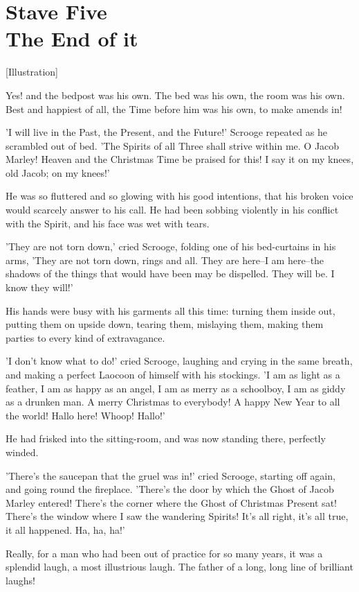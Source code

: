 \chapter{Stave Five\\The End of it}
[Illustration]

Yes! and the bedpost was his own. The bed was his own, the room was his
own. Best and happiest of all, the Time before him was his own, to make
amends in!

'I will live in the Past, the Present, and the Future!' Scrooge repeated
as he scrambled out of bed. 'The Spirits of all Three shall strive
within me. O Jacob Marley! Heaven and the Christmas Time be praised for
this! I say it on my knees, old Jacob; on my knees!'

He was so fluttered and so glowing with his good intentions, that his
broken voice would scarcely answer to his call. He had been sobbing
violently in his conflict with the Spirit, and his face was wet with
tears.

'They are not torn down,' cried Scrooge, folding one of his bed-curtains
in his arms, 'They are not torn down, rings and all. They are here--I am
here--the shadows of the things that would have been may be dispelled.
They will be. I know they will!'

His hands were busy with his garments all this time: turning them inside
out, putting them on upside down, tearing them, mislaying them, making
them parties to every kind of extravagance.

'I don't know what to do!' cried Scrooge, laughing and crying in the
same breath, and making a perfect Laocoon of himself with his stockings.
'I am as light as a feather, I am as happy as an angel, I am as merry as
a schoolboy, I am as giddy as a drunken man. A merry Christmas to
everybody! A happy New Year to all the world! Hallo here! Whoop! Hallo!'

He had frisked into the sitting-room, and was now standing there,
perfectly winded.

'There's the saucepan that the gruel was in!' cried Scrooge, starting
off again, and going round the fireplace. 'There's the door by which the
Ghost of Jacob Marley entered! There's the corner where the Ghost of
Christmas Present sat! There's the window where I saw the wandering
Spirits! It's all right, it's all true, it all happened. Ha, ha, ha!'

Really, for a man who had been out of practice for so many years, it was
a splendid laugh, a most illustrious laugh. The father of a long, long
line of brilliant laughs!

